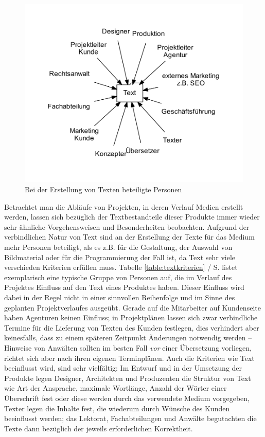 \begin{figure}[htb]
\begin{center}
\includegraphics[width=\textwidth]{media/chart-2.pdf}
\end{center}
\caption{Bei der Erstellung von Texten beteiligte Personen}
\label{chart:2}
\end{figure}

Betrachtet man die Abläufe von Projekten, in deren Verlauf Medien erstellt werden, lassen sich bezüglich der Textbestandteile dieser Produkte immer wieder sehr ähnliche Vorgehensweisen und Besonderheiten beobachten. Aufgrund der verbindlichen Natur von Text sind an der Erstellung der Texte für das Medium mehr Personen beteiligt, als es z.B. für die Gestaltung, der Auswahl von Bildmaterial oder für die Programmierung der Fall ist,  da Text sehr viele verschieden Kriterien erfüllen muss. Tabelle \ref{table:textkriterien} / S.\pageref{table:textkriterien} listet exemplarisch eine typische Gruppe von Personen auf, die im Verlauf des Projektes Einfluss auf den Text eines Produktes haben. Dieser Einfluss wird dabei in der Regel nicht in einer sinnvollen Reihenfolge und im Sinne des geplanten Projektverlaufes ausgeübt. Gerade auf die Mitarbeiter auf Kundenseite haben Agenturen keinen Einfluss; in Projektplänen lassen sich zwar verbindliche Termine für die Lieferung von Texten des Kunden festlegen, dies verhindert aber keinesfalls, dass zu einem späteren Zeitpunkt Änderungen notwendig werden -- Hinweise von Anwälten sollten im besten Fall \emph{vor} einer Übersetzung vorliegen, richtet sich aber nach ihren eigenen Terminplänen. Auch die Kriterien wie Text beeinflusst wird, sind sehr vielfältig: Im Entwurf und in der Umsetzung der Produkte legen Designer, Architekten und Produzenten die Struktur von Text wie Art der Ansprache, maximale Wortlänge, Anzahl der Wörter einer Überschrift fest oder diese werden durch das verwendete Medium vorgegeben, Texter legen die Inhalte fest, die wiederum durch Wünsche des Kunden beeinflusst werden; das Lektorat, Fachabteilungen und Anwälte begutachten die Texte dann bezüglich der jeweils erforderlichen Korrektheit.

